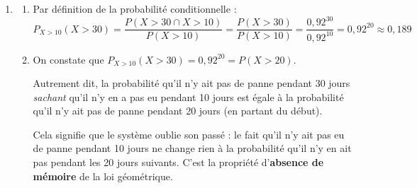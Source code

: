 \documentclass[TC, exos, e,p]{phBook}
\begin{document}
\begin{exercice}
\begin{correction}
\begin{enumerate}
\item
	\begin{enumerate}
		\item Par définition de la probabilité conditionnelle :
$$P_{X > 10}(X > 30) = \dfrac{P(X > 30 \cap X > 10)}{P(X > 10)} = \dfrac{P(X > 30)}{P(X > 10)} = \dfrac{0,92^{30}}{0,92^{10}} = 0,92^{20} \approx 0,189$$

		\item On constate que $P_{X > 10}(X > 30) = 0,92^{20} = P(X > 20)$.

Autrement dit, la probabilité qu'il n'y ait pas de panne pendant 30 jours \emph{sachant} qu'il n'y en a pas eu pendant 10 jours est égale à la probabilité qu'il n'y ait pas de panne pendant 20 jours (en partant du début).

Cela signifie que \og le système oublie son passé\fg{} : le fait qu'il n'y ait pas eu de panne pendant 10 jours ne change rien à la probabilité qu'il n'y en ait pas pendant les 20 jours suivants. C'est la propriété d'\textbf{absence de mémoire} de la loi géométrique.
	\end{enumerate}






\end{enumerate}
\end{correction}
\end{exercice}
\end{document}
